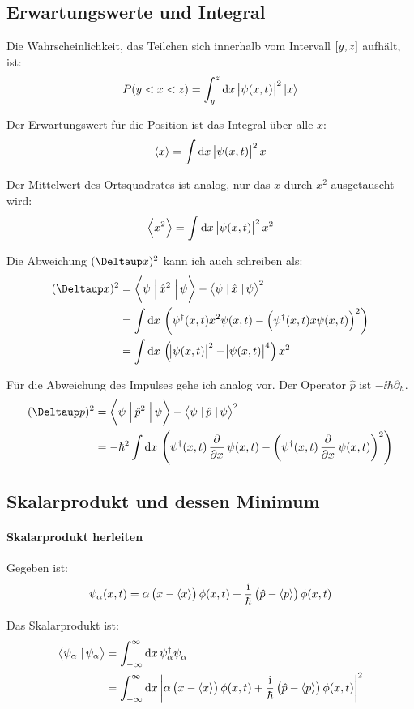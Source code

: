 \subsection{Erwartungswerte und Integral}

Die Wahrscheinlichkeit, das Teilchen sich innerhalb vom Intervall $\intcc{y,
z}$ aufhält, ist:
\[
	P(y < x < z) = \int_y^z \dif x \, \abs{\psi(x, t)}^2 \ket x
\]

Der Erwartungswert für die Position ist das Integral über alle $x$:
\[
	\bracket x = \int\dif x \, \abs{\psi(x, t)}^2 x
\]

Der Mittelwert des Ortsquadrates ist analog, nur das $x$ durch $x^2$
ausgetauscht wird:
\[
	\bracket{x^2} = \int\dif x \, \abs{\psi(x, t)}^2 x^2
\]

Die Abweichung $(\Deltaup x)^2$ kann ich auch schreiben als:
\cite{wikipedia-quantum_operators}
\begin{align*}
	(\Deltaup x)^2
	&= \braproket{\psi}{\hat x^2}{\psi} - \braproket{\psi}{\hat x}{\psi}^2 \\
	&= \int \dif x \, \del{\psi^\dagger(x, t) x^2 \psi(x, t) - \del{\psi^\dagger(x, t) x \psi(x, t)}^2} \\
	&= \int \dif x \, \del{\abs{\psi(x, t)}^2 - \abs{\psi(x, t)}^4} x^2
\end{align*}

Für die Abweichung des Impulses gehe ich analog vor. Der Operator $\hat p$ ist
$- \ii \hbar \partial_h$.
\begin{align*}
	(\Deltaup p)^2
	&= \braproket{\psi}{\hat p^2}{\psi} - \braproket{\psi}{\hat p}{\psi}^2 \\
	&= - \hbar^2 \int \dif x \, \del{\psi^\dagger(x, t) \dpd{}x \psi(x, t) - \del{\psi^\dagger(x, t) \dpd{}x \psi(x, t)}^2}
\end{align*}

\fehlt

\subsection{Skalarprodukt und dessen Minimum}

\paragraph{Skalarprodukt herleiten}

Gegeben ist:
\[
	\psi_\alpha(x, t) = \alpha \del{x - \bracket x} \phi(x, t) + \frac\ii\hbar \del{\hat p - \bracket p} \phi(x, t)
\]

Das Skalarprodukt ist:
\begin{align*}
	\braket{\psi_\alpha}{\psi_\alpha}
	&= \int_{-\infty}^\infty \dif x \, \psi_\alpha^\dagger \psi_\alpha^{} \\
	&=  \int_{-\infty}^\infty \dif x \, \abs{\alpha \del{x - \bracket x} \phi(x, t) + \frac\ii\hbar \del{\hat p - \bracket p} \phi(x, t)}^2
\end{align*}

